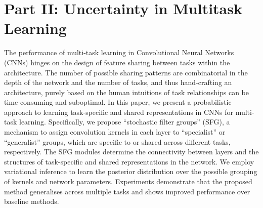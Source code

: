 %
%
%
%
%
%
%
%
\chapter{Part II: Uncertainty in Multitask Learning }
\label{chapter:multitaskuncertainty_part2}

The performance of multi-task learning in Convolutional Neural Networks (CNNs) hinges on the design of feature sharing between tasks within the architecture. The number of possible sharing patterns are combinatorial in the depth of the network and the number of tasks, and thus hand-crafting an architecture, purely based on the human intuitions of task relationships can be time-consuming and suboptimal. In this paper, we present a probabilistic approach to learning task-specific and shared representations in CNNs for multi-task learning. Specifically, we propose ``stochastic filter groups'' (SFG), a mechanism to assign convolution kernels in each layer to ``specialist'' or ``generalist'' groups, which are specific to or shared across different tasks, respectively. The SFG modules determine the connectivity between layers and the structures of task-specific and shared representations in the network. We employ variational inference to learn the posterior distribution over the possible grouping of kernels and network parameters. Experiments demonstrate that the proposed method generalises across multiple tasks and shows improved performance over baseline methods. 

